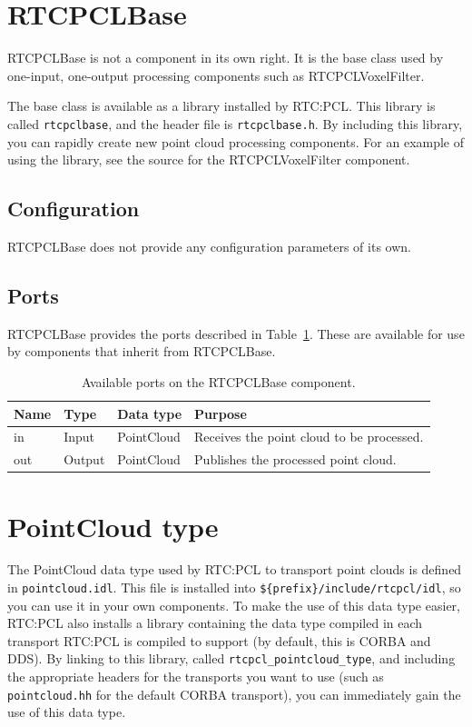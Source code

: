 \documentclass[a4paper,10pt]{article}
\begin{document}
\section{RTCPCLBase}
\label{sec:rtcpcl}

RTCPCLBase is not a component in its own right. It is the base class used by
one-input, one-output processing components such as RTCPCLVoxelFilter.

The base class is available as a library installed by RTC:PCL. This library is
called \verb|rtcpclbase|, and the header file is \verb|rtcpclbase.h|. By
including this library, you can rapidly create new point cloud processing
components. For an example of using the library, see the source for the
RTCPCLVoxelFilter component.

\subsection{Configuration}
\label{sec1:_configuration}

RTCPCLBase does not provide any configuration parameters of its own.

\subsection{Ports}
\label{sec1:_port}

RTCPCLBase provides the ports described in Table~\ref{tab:base_ports}. These
are available for use by components that inherit from RTCPCLBase.

\begin{table}[t]
  \centering
  \begin{tabularx}{\columnwidth}{lllX}
    \toprule
    Name & Type & Data type & Purpose \\
    \midrule
    in & Input & PointCloud & Receives the point cloud to be processed. \\
    out & Output & PointCloud & Publishes the processed point cloud. \\
    \bottomrule
  \end{tabularx}
  \caption{Available ports on the RTCPCLBase component.}
  \label{tab:base_ports}
\end{table}

\section{PointCloud type}
\label{sec:pointcloud-type}

The PointCloud data type used by RTC:PCL to transport point clouds is defined
in \verb|pointcloud.idl|. This file is installed into
\verb|${prefix}/include/rtcpcl/idl|, so you can use it in your own components.
To make the use of this data type easier, RTC:PCL also installs a library
containing the data type compiled in each transport RTC:PCL is compiled to
support (by default, this is CORBA and DDS). By linking to this library, called
\verb|rtcpcl_pointcloud_type|, and including the appropriate headers for the
transports you want to use (such as \verb|pointcloud.hh| for the default CORBA
transport), you can immediately gain the use of this data type.
\end{document}
